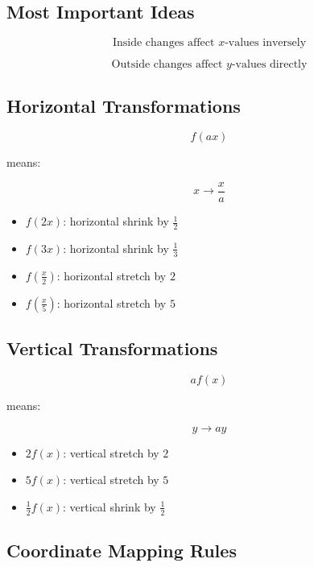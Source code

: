 \documentclass[11pt]{article}
\begin{document}
\subsection*{Most Important Ideas}

\[
\boxed{
\text{Inside changes affect }x\text{-values inversely}
}
\]

\[
\boxed{
\text{Outside changes affect }y\text{-values directly}
}
\]

\subsection*{Horizontal Transformations}

\[
f(ax)
\]

means:

\[
x\rightarrow\frac{x}{a}
\]

\begin{itemize}

\item $f(2x)$: horizontal shrink by $\frac12$
\item $f(3x)$: horizontal shrink by $\frac13$
\item $f\left(\frac{x}{2}\right)$: horizontal stretch by $2$
\item $f\left(\frac{x}{5}\right)$: horizontal stretch by $5$

\end{itemize}

\subsection*{Vertical Transformations}

\[
af(x)
\]

means:

\[
y\rightarrow ay
\]

\begin{itemize}

\item $2f(x)$: vertical stretch by $2$
\item $5f(x)$: vertical stretch by $5$
\item $\frac12 f(x)$: vertical shrink by $\frac12$

\end{itemize}

\subsection*{Coordinate Mapping Rules}
\end{document}
